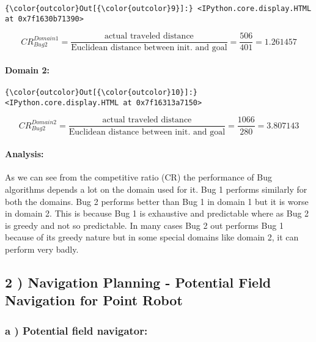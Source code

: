 \documentclass{article}
\begin{document}
            \begin{Verbatim}[commandchars=\\\{\}]
{\color{outcolor}Out[{\color{outcolor}9}]:} <IPython.core.display.HTML at 0x7f1630b71390>
\end{Verbatim}
        
    \[{CR}_{Bug2}^{Domain1} = \frac{\mbox{actual traveled distance}}{\mbox{Euclidean distance between init. and goal}} = \frac{506}{401} = 1.261457\]


    \paragraph{Domain 2:}



            \begin{Verbatim}[commandchars=\\\{\}]
{\color{outcolor}Out[{\color{outcolor}10}]:} <IPython.core.display.HTML at 0x7f16313a7150>
\end{Verbatim}
        
    \[{CR}_{Bug2}^{Domain2} = \frac{\mbox{actual traveled distance}}{\mbox{Euclidean distance between init. and goal}} = \frac{1066}{280} = 3.807143\]


    \paragraph{Analysis:}


    As we can see from the competitive ratio (CR) the performance of Bug
algorithms depends a lot on the domain used for it. Bug 1 performs
similarly for both the domains. Bug 2 performs better than Bug 1 in
domain 1 but it is worse in domain 2. This is because Bug 1 is
exhaustive and predictable where as Bug 2 is greedy and not so
predictable. In many cases Bug 2 out performs Bug 1 because of its
greedy nature but in some special domains like domain 2, it can perform
very badly.


    \subsection{2 ) Navigation Planning - Potential Field Navigation for Point Robot}



    \subsubsection{a ) Potential field navigator:}
\end{document}
